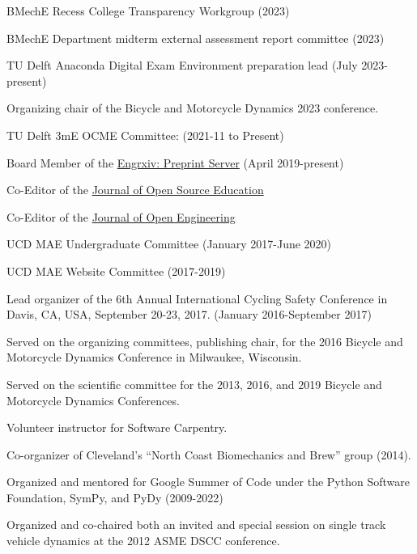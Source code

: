 \documentclass[10pt]{article}
\newenvironment{innerlist}[1][\enskip\textbullet]%
        {\begin{compactitem}[#1]}{\end{compactitem}}
\begin{document}
\begin{innerlist}
  \item BMechE Recess College Transparency Workgroup (2023)
  \item BMechE Department midterm external assessment report committee (2023)
  \item TU Delft Anaconda Digital Exam Environment preparation lead (July
    2023-present)
  \item Organizing chair of the Bicycle and Motorcycle Dynamics 2023
    conference.
  \item TU Delft 3mE OCME Committee: (2021-11 to Present)
  \item Board Member of the \href{http://engrxiv.org}{Engrxiv: Preprint Server}
    (April 2019-present)
  \item Co-Editor of the \href{http://joss.theoj.org/}{Journal of Open Source
    Education}
  \item Co-Editor of the \href{https://www.tjoe.org/}{Journal of Open
    Engineering}
  \item UCD MAE Undergraduate Committee (January 2017-June 2020)
  \item UCD MAE Website Committee (2017-2019)
  \item Lead organizer of the 6th Annual International Cycling Safety
    Conference in Davis, CA, USA, September 20-23, 2017. (January
    2016-September 2017)
  \item Served on the organizing committees, publishing chair, for the 2016
    Bicycle and Motorcycle Dynamics Conference in Milwaukee, Wisconsin.
  \item Served on the scientific committee for the 2013, 2016, and 2019 Bicycle
    and Motorcycle Dynamics Conferences.
  \item Volunteer instructor for Software Carpentry.
  \item Co-organizer of Cleveland's ``North Coast Biomechanics and Brew'' group
    (2014).
  \item Organized and mentored for Google Summer of Code under the Python
    Software Foundation, SymPy, and PyDy (2009-2022)
  \item Organized and co-chaired both an invited and special session on single
    track vehicle dynamics at the 2012 ASME DSCC conference.
\end{innerlist}
\end{document}

